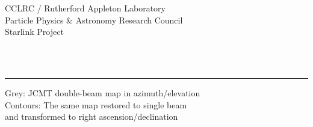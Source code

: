 \thispagestyle{empty}

\begin{latexonly}
   CCLRC / {\sc Rutherford Appleton Laboratory} \hfill {\bf \stardocname}\\
   {\large Particle Physics \& Astronomy Research Council}\\
   {\large Starlink Project\\}
   {\large \stardoccategory\ \stardocnumber}
   \begin{flushright}
   \stardocauthors\\
   \stardocdate
   \end{flushright}
   \vspace{-4mm}
   \rule{\textwidth}{0.5mm}
   \vspace{5mm}
   \begin{center}
   {\Huge\bf  \stardoctitle}
   \end{center}
   \vspace{5mm}

   \begin{center}
   \leavevmode\epsfysize=130mm

   Grey: JCMT double-beam map in azimuth/elevation\\
   Contours: The same map restored to single beam\\
   and transformed to right ascension/declination
   \end{center}

\end{latexonly}

